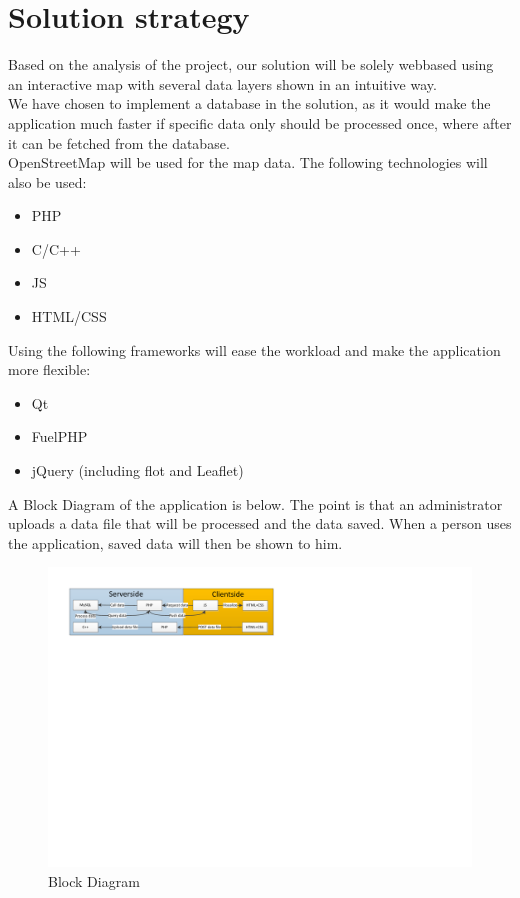 \documentclass[10pt,a4paper]{article}
\begin{document}
\section{Solution strategy}
Based on the analysis of the project, our solution will be solely webbased using an interactive map with several data layers shown in an intuitive way.\\
We have chosen to implement a database in the solution, as it would make the application much faster if specific data only should be processed once, where after it can be fetched from the database.\\
OpenStreetMap will be used for the map data. The following technologies will also be used:\\
\begin{itemize}
  \item PHP
  \item C/C++
  \item JS
  \item HTML/CSS
\end{itemize}
Using the following frameworks will ease the workload and make the application more flexible:\\
\begin{itemize}
  \item Qt
  \item FuelPHP
  \item jQuery (including flot and Leaflet)
\end{itemize}
A Block Diagram of the application is below. The point is that an administrator uploads a data file that will be processed and the data saved. When a person uses the application, saved data will then be shown to him.
\begin{figure}[!ht]
\centering
\includegraphics[bb=1cm 16cm 16cm 20cm,scale=0.9]{blockdiagram}
\caption{Block Diagram}
\end{figure}
\end{document}

